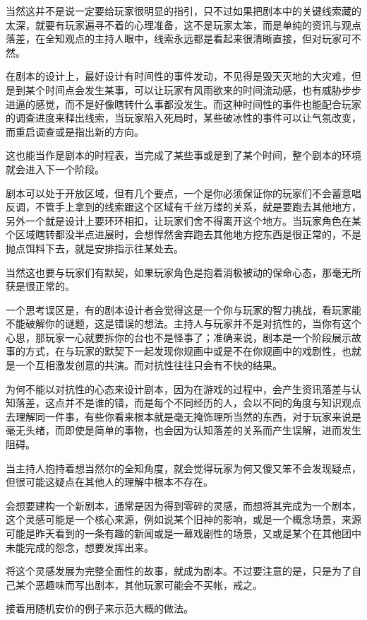 \documentclass[a4paper,zihao=-4,notitlepage,twoside,openright]{ctexart}
\begin{document}
当然这并不是说一定要给玩家很明显的指引，只不过如果把剧本中的关键线索藏的太深，就要有玩家遍寻不着的心理准备，这不是玩家太笨，而是单纯的资讯与观点落差，在全知观点的主持人眼中，线索永远都是看起来很清晰直接，但对玩家可不然。

在剧本的设计上，最好设计有时间性的事件发动，不见得是毁天灭地的大灾难，但是到某个时间点会发生某事，可以让玩家有风雨欲来的时间流动感，也有威胁步步进逼的感觉，而不是好像瞎转什么事都没发生。而这种时间性的事件也能配合玩家的调查进度来释出线索，当玩家陷入死局时，某些破冰性的事件可以让气氛改变，而重启调查或是指出新的方向。

这也能当作是剧本的时程表，当完成了某些事或是到了某个时间，整个剧本的环境就会进入下一个阶段。

剧本可以处于开放区域，但有几个要点，一个是你必须保证你的玩家们不会蓄意唱反调，不管手上拿到的线索跟这个区域有千丝万缕的关系，就是要跑去其他地方，另外一个就是设计上要环环相扣，让玩家们舍不得离开这个地方。当玩家角色在某个区域瞎转都没半点进展时，会想悍然舍弃跑去其他地方挖东西是很正常的，不是抛点饵料下去，就是安排指示往某处去。

当然这也要与玩家们有默契，如果玩家角色是抱着消极被动的保命心态，那毫无所获是很正常的。

一个思考误区是，有的剧本设计者会觉得这是一个你与玩家的智力挑战，看玩家能不能破解你的谜题，这是错误的想法。主持人与玩家并不是对抗性的，当你有这个心思，那玩家一心就要拆你的台也不是怪事了；准确来说，剧本是一个阶段展示故事的方式，在与玩家的默契下一起发现你规画中或是不在你规画中的戏剧性，也就是一个互相激发创意的共演。而对抗性往往只会有不快的结果。

为何不能以对抗性的心态来设计剧本，因为在游戏的过程中，会产生资讯落差与认知落差，这点并不是谁的错，而是每个不同经历的人，会以不同的角度与知识观点去理解同一件事，有些你看来根本就是毫无掩饰理所当然的东西，对于玩家来说是毫无头绪，而即使是简单的事物，也会因为认知落差的关系而产生误解，进而发生阻碍。

当主持人抱持着想当然尔的全知角度，就会觉得玩家为何又傻又笨不会发现疑点，但很可能这疑点在其他人的理解中根本不存在。

会想要建构一个新剧本，通常是因为得到零碎的灵感，而想将其完成为一个剧本，这个灵感可能是一个核心来源，例如说某个旧神的影响，或是一个概念场景，来源可能是昨天看到的一条有趣的新闻或是一幕戏剧性的场景，又或是某个在其他团中未能完成的怨念，想要发挥出来。

将这个灵感发展为完整全面性的故事，就成为剧本。不过要注意的是，只是为了自己某个恶趣味而写出剧本，其他玩家可能会不买帐，戒之。

接着用随机安价的例子来示范大概的做法。
\end{document}
